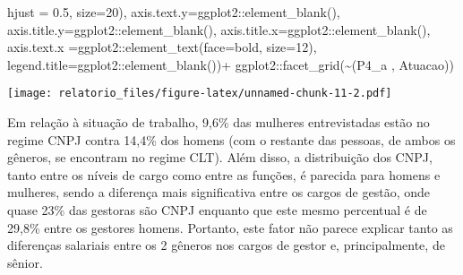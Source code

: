 \documentclass[
]{article}
\newenvironment{Shaded}{\begin{snugshade}}{\end{snugshade}}
\newcommand{\AttributeTok}[1]{\textcolor[rgb]{0.77,0.63,0.00}{#1}}
\newcommand{\DecValTok}[1]{\textcolor[rgb]{0.00,0.00,0.81}{#1}}
\newcommand{\FloatTok}[1]{\textcolor[rgb]{0.00,0.00,0.81}{#1}}
\newcommand{\FunctionTok}[1]{\textcolor[rgb]{0.00,0.00,0.00}{#1}}
\newcommand{\NormalTok}[1]{#1}
\newcommand{\SpecialCharTok}[1]{\textcolor[rgb]{0.00,0.00,0.00}{#1}}
\newcommand{\StringTok}[1]{\textcolor[rgb]{0.31,0.60,0.02}{#1}}
\begin{document}
\begin{Shaded}
\begin{Highlighting}[]
                                                  \AttributeTok{hjust =} \FloatTok{0.5}\NormalTok{, }\AttributeTok{size=}\DecValTok{20}\NormalTok{),}
                 \AttributeTok{axis.text.y=}\NormalTok{ggplot2}\SpecialCharTok{::}\FunctionTok{element\_blank}\NormalTok{(),}
                 \AttributeTok{axis.title.y=}\NormalTok{ggplot2}\SpecialCharTok{::}\FunctionTok{element\_blank}\NormalTok{(),}
                 \AttributeTok{axis.title.x=}\NormalTok{ggplot2}\SpecialCharTok{::}\FunctionTok{element\_blank}\NormalTok{(),}
                 \AttributeTok{axis.text.x =}\NormalTok{ggplot2}\SpecialCharTok{::}\FunctionTok{element\_text}\NormalTok{(}\AttributeTok{face=}\StringTok{\textquotesingle{}bold\textquotesingle{}}\NormalTok{, }\AttributeTok{size=}\DecValTok{12}\NormalTok{),}
                 \AttributeTok{legend.title=}\NormalTok{ggplot2}\SpecialCharTok{::}\FunctionTok{element\_blank}\NormalTok{())}\SpecialCharTok{+}
\NormalTok{  ggplot2}\SpecialCharTok{::}\FunctionTok{facet\_grid}\NormalTok{(}\SpecialCharTok{\textasciitilde{}}\StringTok{\textasciigrave{}}\AttributeTok{(\textquotesingle{}P4\_a \textquotesingle{}, \textquotesingle{}Atuacao\textquotesingle{})}\StringTok{\textasciigrave{}}\NormalTok{)}
\end{Highlighting}
\end{Shaded}

\texttt{[image: relatorio\_files/figure-latex/unnamed-chunk-11-2.pdf]}

Em relação à situação de trabalho, 9,6\% das mulheres entrevistadas
estão no regime CNPJ contra 14,4\% dos homens (com o restante das
pessoas, de ambos os gêneros, se encontram no regime CLT). Além disso, a
distribuição dos CNPJ, tanto entre os níveis de cargo como entre as
funções, é parecida para homens e mulheres, sendo a diferença mais
significativa entre os cargos de gestão, onde quase 23\% das gestoras
são CNPJ enquanto que este mesmo percentual é de 29,8\% entre os
gestores homens. Portanto, este fator não parece explicar tanto as
diferenças salariais entre os 2 gêneros nos cargos de gestor e,
principalmente, de sênior.
\end{document}
